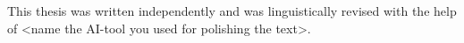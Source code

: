 


This thesis was written independently and was linguistically revised with the help of <name the AI-tool you used for polishing the text>.
